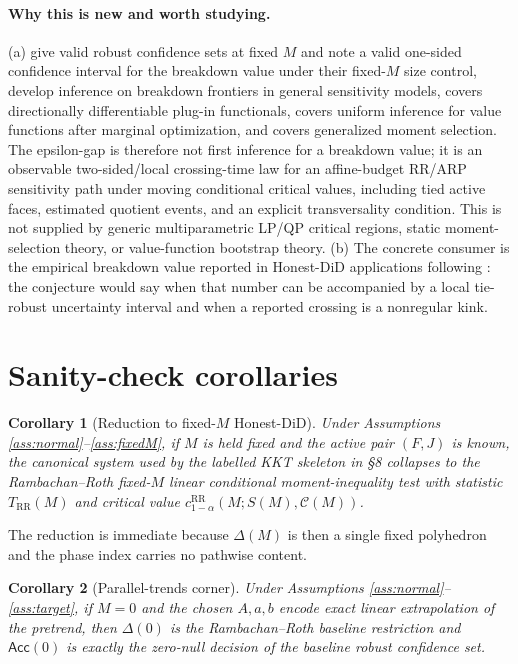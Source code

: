 \documentclass[11pt]{article}
\theoremstyle{definition}
\theoremstyle{plain}
\newtheorem{corollary}{Corollary}
\theoremstyle{remark}
\begin{document}
\paragraph{Why this is new and worth studying.}
(a) \citet{RambachanRoth2023} give valid robust confidence sets at fixed
\(M\) and note a valid one-sided confidence interval for the breakdown value
under their fixed-\(M\) size control, \citet{MastenPoirier2020} develop
inference on breakdown frontiers in general sensitivity models,
\citet{FangSantos2019} covers directionally differentiable plug-in
functionals, \citet{FirpoGalvaoParker2023} covers uniform inference for value
functions after marginal optimization, and \citet{AndrewsSoares2010} covers
generalized moment selection.  The epsilon-gap is therefore not first
inference for a breakdown value; it is an observable two-sided/local
crossing-time law for an affine-budget RR/ARP sensitivity path under moving
conditional critical values, including tied active faces, estimated quotient
events, and an explicit transversality condition.  This is not supplied by
generic multiparametric LP/QP critical regions, static moment-selection theory,
or value-function bootstrap theory.  (b) The
concrete consumer is the empirical breakdown value reported in Honest-DiD
applications following \citet{RambachanRoth2023}: the conjecture would say
when that number can be accompanied by a local tie-robust uncertainty interval
and when a reported crossing is a nonregular kink.

\section{Sanity-check corollaries}
\begin{corollary}[Reduction to fixed-\(M\) Honest-DiD]\label{cor:fixedM}
Under Assumptions \ref{ass:normal}--\ref{ass:fixedM}, if \(M\) is held fixed
and the active pair \((F,J)\) is known, the canonical system used by the
labelled KKT skeleton in §8
collapses to the Rambachan--Roth fixed-\(M\) linear conditional
moment-inequality test with statistic \(T_{\mathrm{RR}}(M)\) and critical
value \(c_{1-\alpha}^{\mathrm{RR}}(M;S(M),\mathcal{C}(M))\).
\end{corollary}

The reduction is immediate because \(\Delta(M)\) is then a single fixed
polyhedron and the phase index carries no pathwise content.

\begin{corollary}[Parallel-trends corner]\label{cor:M0}
Under Assumptions \ref{ass:normal}--\ref{ass:target}, if \(M=0\) and the
chosen \(A,a,b\) encode exact linear extrapolation of the pretrend, then
\(\Delta(0)\) is the Rambachan--Roth baseline restriction and
\(\mathsf{Acc}(0)\) is exactly the zero-null decision of the baseline robust
confidence set.
\end{corollary}
\end{document}
